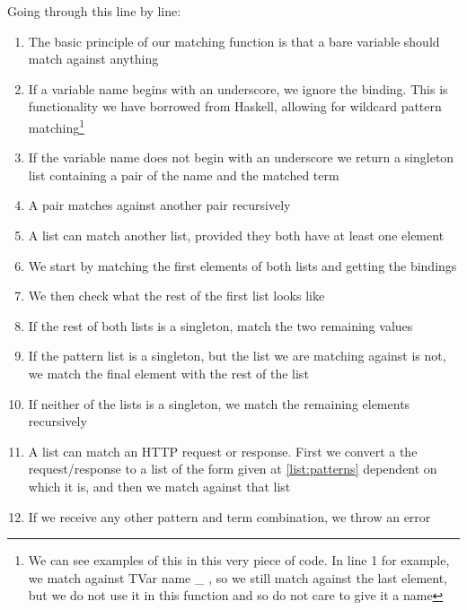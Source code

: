 Going through this line by line:
\begin{enumerate}
    \item The basic principle of our matching function is that a bare variable should match against anything
    \item If a variable name begins with an underscore, we ignore the binding. This is functionality we have borrowed from Haskell, allowing for wildcard pattern matching\footnote{We can see examples of this in this very piece of code. In line 1 for example, we match against TVar name \_ , so we still match against the last element, but we do not use it in this function and so do not care to give it a name}
    \item If the variable name does not begin with an underscore we return a singleton list containing a pair of the name and the matched term
    \item A pair matches against another pair recursively
    \item A list can match another list, provided they both have at least one element
    \item We start by matching the first elements of both lists and getting the bindings
    \item We then check what the rest of the first list looks like   
    \item If the rest of both lists is a singleton, match the two remaining values
    \item If the pattern list is a singleton, but the list we are matching against is not, we match the final element with the rest of the list   
    \item If neither of the lists is a singleton, we match the remaining elements recursively
    \item A list can match an HTTP request or response. First we convert a the request/response to a list of the form given at \ref{list:patterns} dependent on which it is, and then we match against that list
    \item If we receive any other pattern and term combination, we throw an error   
\end{enumerate}
